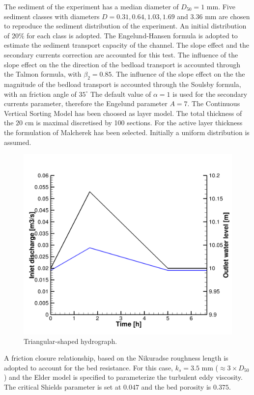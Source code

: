The sediment of the experiment has a median diameter of $D_{50}=1$ mm. Five
sediment classes with diameters $D=0.31, 0.64, 1.03, 1.69$ and $3.36$ mm are
chosen to reproduce the sediment distribution of the experiment. An initial
distribution of 20\% for each class is adopted.
 The Engelund-Hansen formula is adopted to estimate the sediment transport
 capacity of the channel. The slope effect and the secondary currents
 correction are accounted for this test. The influence of the slope effect on
 the the direction of the bedload transport is accounted through the Talmon
 formula, with $\beta_2=0.85$. The influence of the slope effect on the the
 magnitude of the bedload transport is accounted through the Soulsby formula,
 with an friction angle of $35^{\circ}$
The default value of $\alpha=1$ is used for the secondary currents parameter,
therefore the Engelund parameter $A=7$.
The Continuous Vertical Sorting Model has been choosed as layer model. The
total thickness of the $20$ cm is maximal discretised by 100 sections. For the
active layer thickness the formulation of Malcherek has been selected.
Initially a uniform distribution is assumed.

\begin{figure}[!h]
\centering
\includegraphics[scale=0.15]{yen_boundaries.png}
 \caption{Triangular-shaped hydrograph.}\label{fig:hydro}
\end{figure}

A friction closure relationship, based on the Nikuradse roughness length is
adopted to account for the bed resistance. For this case, $k_s=3.5$ mm
($\approx 3\times D_{50}$) and the Elder model is specified to parameterize the
turbulent eddy viscosity.
The critical Shields parameter is set at $0.047$ and the bed porosity is
$0.375$.


